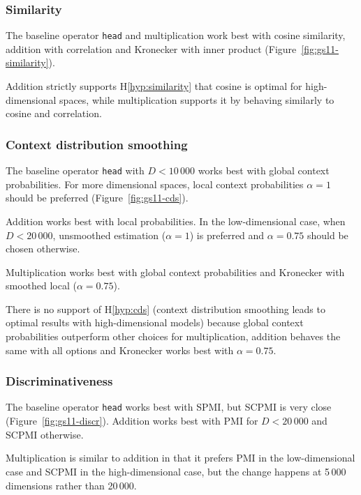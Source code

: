 

\subsubsection{Similarity}

The baseline operator \texttt{head} and multiplication work best with cosine similarity, addition with correlation and Kronecker with inner product (Figure~\ref{fig:gs11-similarity}).

Addition strictly supports H\ref{hyp:similarity} that cosine is optimal for high-dimensional spaces, while multiplication supports it by behaving similarly to cosine and correlation.

\subsubsection{Context distribution smoothing}

The baseline operator \texttt{head} with $D < 10\,000$ works best with global context probabilities. For more dimensional spaces, local context probabilities $\alpha = 1$ should be preferred (Figure~\ref{fig:gs11-cds}).

Addition works best with local probabilities. In the low-dimensional case, when $D < 20\,000$, unsmoothed estimation ($\alpha = 1$) is preferred and $\alpha = 0.75$ should be chosen otherwise.

Multiplication works best with global context probabilities and Kronecker with smoothed local ($\alpha = 0.75$).

There is no support of H\ref{hyp:cds} (context distribution smoothing leads to optimal results with high-dimensional models) because global context probabilities outperform other choices for multiplication, addition behaves the same with all options and Kronecker works best with $\alpha = 0.75$.



\subsubsection{Discriminativeness}



The baseline operator \texttt{head} works best with SPMI, but SCPMI is very close (Figure~\ref{fig:gs11-discr}). Addition works best with PMI for $D < 20\,000$ and SCPMI otherwise.

Multiplication is similar to addition in that it prefers PMI in the low-dimensional case and SCPMI in the high-dimensional case, but the change happens at 5\,000 dimensions rather than 20\,000.


